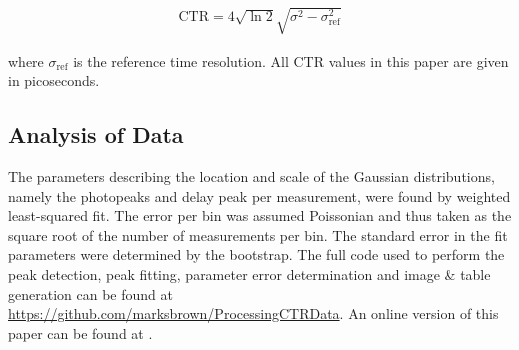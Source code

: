 \begin{align}
\text{CTR} = 4\sqrt{\ln{2}}\sqrt{\sigma^2-\sigma_\textrm{ref}^2}
\end{align}

where $\sigma_\text{ref}$ is the reference time resolution. All CTR values in this paper are given in picoseconds.

\subsection{Analysis of Data}
The parameters describing the location and scale of the Gaussian distributions, namely the photopeaks and delay peak per measurement, were found by weighted least-squared fit. The error per bin was assumed Poissonian and thus taken as the square root of the number of measurements per bin. The standard error in the fit parameters were determined by the bootstrap\cite{degroot2012probability}. The full code used to perform the peak detection, peak fitting, parameter error determination and image \& table generation can be found at \href{https://github.com/marksbrown/ProcessingCTRData}{https://github.com/marksbrown/ProcessingCTRData}. An online version of this paper can be found at \cite{Brown2014}.